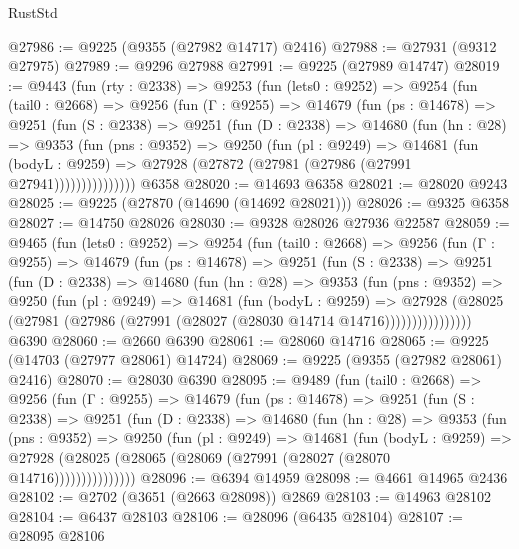 \begin{lexlean}{RustStd}
\begin{coremodule}
@27986 := @9225 (@9355 (@27982 @14717) @2416)
@27988 := @27931 (@9312 @27975)
@27989 := @9296 @27988
@27991 := @9225 (@27989 @14747)
@28019 := @9443
    (fun (rty : @2338) =>
    @9253
      (fun (lets0 : @9252) =>
      @9254
        (fun (tail0 : @2668) =>
        @9256
          (fun (Γ : @9255) =>
          @14679
            (fun (ps : @14678) =>
            @9251
              (fun (S : @2338) =>
              @9251
                (fun (D : @2338) =>
                @14680
                  (fun (hn : @28) =>
                  @9353
                    (fun (pns : @9352) =>
                    @9250
                      (fun (pl : @9249) =>
                      @14681
                        (fun (bodyL : @9259) =>
                        @27928 (@27872 (@27981 (@27986 (@27991 @27941)))))))))))))))
    @6358
@28020 := @14693 @6358
@28021 := @28020 @9243
@28025 := @9225 (@27870 (@14690 (@14692 @28021)))
@28026 := @9325 @6358
@28027 := @14750 @28026
@28030 := @9328 @28026 @27936 @22587
@28059 := @9465
    (fun (lets0 : @9252) =>
    @9254
      (fun (tail0 : @2668) =>
      @9256
        (fun (Γ : @9255) =>
        @14679
          (fun (ps : @14678) =>
          @9251
            (fun (S : @2338) =>
            @9251
              (fun (D : @2338) =>
              @14680
                (fun (hn : @28) =>
                @9353
                  (fun (pns : @9352) =>
                  @9250
                    (fun (pl : @9249) =>
                    @14681
                      (fun (bodyL : @9259) =>
                      @27928
                        (@28025
                          (@27981 (@27986 (@27991 (@28027 (@28030 @14714 @14716))))))))))))))))
    @6390
@28060 := @2660 @6390
@28061 := @28060 @14716
@28065 := @9225 (@14703 (@27977 @28061) @14724)
@28069 := @9225 (@9355 (@27982 @28061) @2416)
@28070 := @28030 @6390
@28095 := @9489
    (fun (tail0 : @2668) =>
    @9256
      (fun (Γ : @9255) =>
      @14679
        (fun (ps : @14678) =>
        @9251
          (fun (S : @2338) =>
          @9251
            (fun (D : @2338) =>
            @14680
              (fun (hn : @28) =>
              @9353
                (fun (pns : @9352) =>
                @9250
                  (fun (pl : @9249) =>
                  @14681
                    (fun (bodyL : @9259) =>
                    @27928 (@28025 (@28065 (@28069 (@27991 (@28027 (@28070 @14716)))))))))))))))
@28096 := @6394 @14959
@28098 := @4661 @14965 @2436
@28102 := @2702 (@3651 (@2663 @28098)) @2869
@28103 := @14963 @28102
@28104 := @6437 @28103
@28106 := @28096 (@6435 @28104)
@28107 := @28095 @28106

\end{coremodule}
\end{lexlean}
